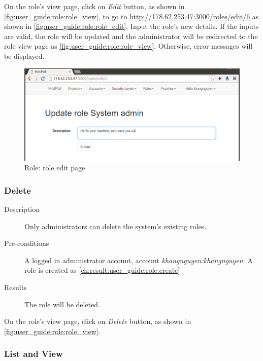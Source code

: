 On the role's view page, click on \emph{Edit} button, as shown in \autoref{fig:user_guide:role:role_view}, 
to go to \href{http://178.62.253.47:3000/roles/edit/6}{http://178.62.253.47:3000/roles/edit/6} as shown in \autoref{fig:user_guide:role:role_edit}.
Input the role's new details.
If the inputs are valid, the role will be updated and the administrator will be redirected to the role view page as \autoref{fig:user_guide:role:role_view}.
Otherwise, error messages will be displayed.

\begin{figure}[bth]
\myfloatalign
\includegraphics[width=1.0\linewidth]{gfx/chapter_5/role/role_edit}
\caption[Role: role edit page]{Role: role edit page}
\label{fig:user_guide:role:role_edit}
\end{figure}

\subsubsection{Delete}
\label{ch:result:user_guide:role:delete}

\begin{description}
\item[Description] Only administrators can delete the system's existing roles.
\item[Pre-conditions] A logged in administrator account, \eg account \emph{khangnguyen:khangnguyen}.
A role is created as \autoref{ch:result:user_guide:role:create}
\item[Results] The role will be deleted.
\end{description}

On the role's view page, click on \emph{Delete} button, as shown in \autoref{fig:user_guide:role:role_view}.

\subsubsection{List and View}
\label{ch:result:user_guide:role:list}

